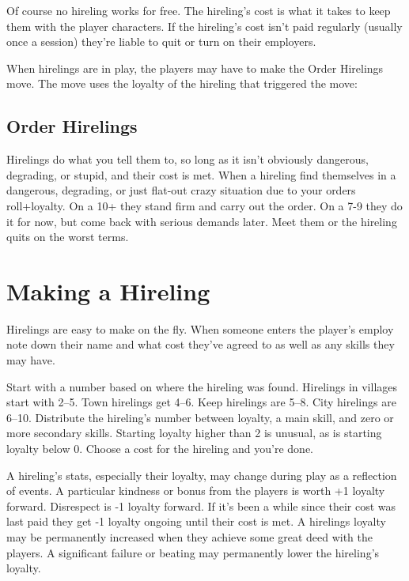        

Of course no hireling works for free. The hireling's cost is what it takes to keep them with the player characters. If the hireling's cost isn't paid regularly (usually once a session) they're liable to quit or turn on their employers.

       

When hirelings are in play, the players may have to make the Order Hirelings move. The move uses the loyalty of the hireling that triggered the move:

       
\subsection{Order Hirelings}    
       

Hirelings do what you tell them to, so long as it isn't obviously dangerous, degrading, or stupid, and their cost is met. When a hireling find themselves in a dangerous, degrading, or just flat-out crazy situation due to your orders roll+loyalty. On a 10+ they stand firm and carry out the order. On a 7-9 they do it for now, but come back with serious demands later. Meet them or the hireling quits on the worst terms.

       
\section{Making a Hireling}  
       

Hirelings are easy to make on the fly. When someone enters the player's employ note down their name and what cost they've agreed to as well as any skills they may have.

       

Start with a number based on where the hireling was found. Hirelings in villages start with 2–5. Town hirelings get 4–6. Keep hirelings are 5–8. City hirelings are 6–10. Distribute the hireling's number between loyalty, a main skill, and zero or more secondary skills. Starting loyalty higher than 2 is unusual, as is starting loyalty below 0. Choose a cost for the hireling and you're done.

       

A hireling's stats, especially their loyalty, may change during play as a reflection of events. A particular kindness or bonus from the players is worth +1 loyalty forward. Disrespect is -1 loyalty forward. If it's been a while since their cost was last paid they get -1 loyalty ongoing until their cost is met. A hirelings loyalty may be permanently increased when they achieve some great deed with the players. A significant failure or beating may permanently lower the hireling's loyalty.

